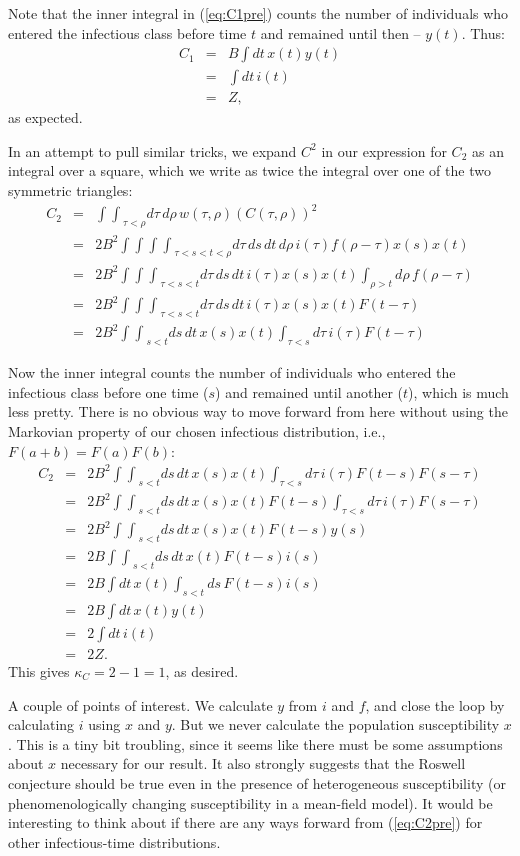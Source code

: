 \documentclass[12pt]{article}
\newcommand{\dt}{dt\,}
\newcommand{\ds}{ds\,}
\newcommand{\dtau}{d\tau\,}
\newcommand{\drho}{d\rho\,}
\newcommand{\intint}{{\int\!\!\int}}
\newcommand{\intintint}{{\int\!\!\int\!\!\int}}
\newcommand{\intintintint}{{\int\!\!\int\!\!\int\!\!\int}}
\newcommand{\eqlab}[1]{\label{eq:#1}}
\newcommand{\eqref}[1]{(\ref{eq:#1})}
\begin{document}
Note that the inner integral in \eqref{C1pre} counts the number of individuals who entered the infectious class before time $t$ and remained until then – $y(t)$.
Thus:
\begin{eqnarray}
	C_1
	&=& B \int \dt x(t) y(t)
	\\ &=& \int \dt i(t)
	\\ &=& Z,
\end{eqnarray}
as expected.

In an attempt to pull similar tricks, we expand $C^2$ in our expression for $C_2$ as an integral over a square, which we write as twice the integral over one of the two symmetric triangles:
\begin{eqnarray}
	C_2
	&=& \intint_{\tau<\rho} \dtau\drho w(\tau, \rho) (C(\tau, \rho))^2
	\\ &=& 2B^2 \intintintint_{\tau<s<t<\rho} \dtau\ds\dt\drho 
		i(\tau) f(\rho-\tau) x(s) x(t)
	\\ &=& 2B^2 \intintint_{\tau<s<t} \dtau\ds\dt 
		i(\tau) x(s) x(t) \int_{\rho>t} \drho f(\rho-\tau)
	\\ &=& 2B^2 \intintint_{\tau<s<t} \dtau\ds\dt 
		i(\tau) x(s) x(t) F(t-\tau)
	\\ &=& 2B^2 \intint_{s<t} \ds\dt 
		x(s) x(t) \int_{\tau<s}\dtau i(\tau) F(t-\tau) \eqlab{C2pre}
\end{eqnarray}

Now the inner integral counts the number of individuals who entered the infectious class before one time ($s$) and remained until another ($t$), which is much less pretty. There is no obvious way to move forward from here without using the Markovian property of our chosen infectious distribution, i.e., $F(a+b) = F(a) F(b)$:
\begin{eqnarray}
	C_2
	&=& 2B^2 \intint_{s<t} \ds\dt 
		x(s) x(t) \int_{\tau<s}\dtau i(\tau) F(t-s) F(s-\tau)
	\\ &=& 2B^2 \intint_{s<t} \ds\dt 
		x(s) x(t) F(t-s) \int_{\tau<s}\dtau i(\tau) F(s-\tau)
	\\ &=& 2B^2 \intint_{s<t} \ds\dt 
		x(s) x(t) F(t-s) y(s)
	\\ &=& 2B \intint_{s<t} \ds\dt x(t) F(t-s) i(s)
	\\ &=& 2B \int \dt x(t) \int_{s<t} \ds F(t-s) i(s)
	\\ &=& 2B \int \dt x(t) y(t)
	\\ &=& 2 \int \dt i(t)
	\\ &=& 2Z.
\end{eqnarray}
This gives $\kappa_C = 2-1 = 1$, as desired.

A couple of points of interest. We calculate $y$ from $i$ and $f$, and close the loop by calculating $i$ using $x$ and $y$. But we never calculate the population susceptibility $x$. This is a tiny bit troubling, since it seems like there must be some assumptions about $x$ necessary for our result. It also strongly suggests that the Roswell conjecture should be true even in the presence of heterogeneous susceptibility (or phenomenologically changing susceptibility in a mean-field model). It would be interesting to think about if there are any ways forward from \eqref{C2pre} for other infectious-time distributions.
\end{document}
